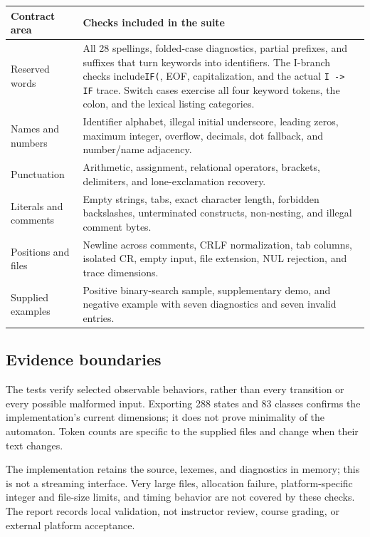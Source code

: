 \documentclass[11pt,a4paper]{article}
\newcommand{\code}[1]{\texttt{#1}}
\begin{document}
\begin{tabularx}{\linewidth}{@{}>{\RaggedRight\arraybackslash}p{35mm}Y@{}}
\toprule Contract area & Checks included in the suite \\\midrule
Reserved words & All 28 spellings, folded-case diagnostics, partial prefixes,
and suffixes that turn keywords into identifiers. The I-branch checks include\newline\code{IF(}, EOF, capitalization, and the actual \code{I -> IF} trace. Switch cases exercise all four keyword tokens, the colon, and the lexical listing categories. \\
Names and numbers & Identifier alphabet, illegal initial underscore, leading
zeros, maximum integer, overflow, decimals, dot fallback, and number/name adjacency. \\
Punctuation & Arithmetic, assignment, relational operators, brackets,
delimiters, and lone-exclamation recovery. \\
Literals and comments & Empty strings, tabs, exact character length, forbidden
backslashes, unterminated constructs, non-nesting, and illegal comment bytes. \\
Positions and files & Newline across comments, CRLF normalization, tab columns,
isolated CR, empty input, file extension, NUL rejection, and trace dimensions. \\
Supplied examples & Positive binary-search sample, supplementary demo, and
negative example with seven diagnostics and seven invalid entries. \\\bottomrule
\end{tabularx}

\subsection{Evidence boundaries}
The tests verify selected observable behaviors, rather than every transition
or every possible malformed input. Exporting 288 states and 83 classes confirms
the implementation's current dimensions; it does not prove minimality of the
automaton. Token counts are specific to the supplied files and change when
their text changes.

The implementation retains the source, lexemes, and diagnostics in memory;
this is not a streaming interface. Very large files, allocation failure,
platform-specific integer and file-size limits, and timing behavior are not
covered by these checks. The report records local validation, not instructor
review, course grading, or external platform acceptance.
\end{document}
